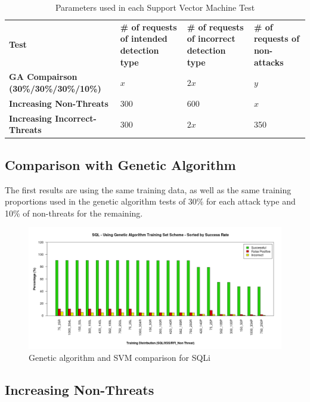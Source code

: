 \begin{table}
	\label{tab:svmTestParameters}
	\begin{tabular}{|p{2.0in}|p{1.125in}|p{1.125in}|p{1.125in}|}
	\hline
	\textbf{Test} & \textbf{\# of requests of intended detection type} & \textbf{\# of requests of incorrect detection type} & \textbf{\# of requests of non-attacks} \\ 
	\hhline{|=|=|=|=|}
	\textbf{GA Compairson (30\%/30\%/30\%/10\%)} & \textbf{$x$} & \textbf{$2x$} & \textbf{$y$} \\
	\hline
	\textbf{Increasing Non-Threats} & 300 & 600 & \textbf{$x$} \\
	\hline
	\textbf{Increasing Incorrect-Threats} & 300 & \textbf{$2x$} & 350 \\
	\hline
	\end{tabular}
	\caption{Parameters used in each Support Vector Machine Test}
\end{table}

\subsection{Comparison with Genetic Algorithm}

The first results are using the same training data, as well as the same training proportions used in the genetic algorithm tests of 30\% for each attack type and 10\% of non-threats for the remaining.

\begin{figure}
	\label{fig:resComparison}
	\includegraphics[width=450px]{./assets/results/svm/comparison/Results_SQL.png}
	\caption{Genetic algorithm and SVM comparison for SQLi}
\end{figure}

\subsection{Increasing Non-Threats}

